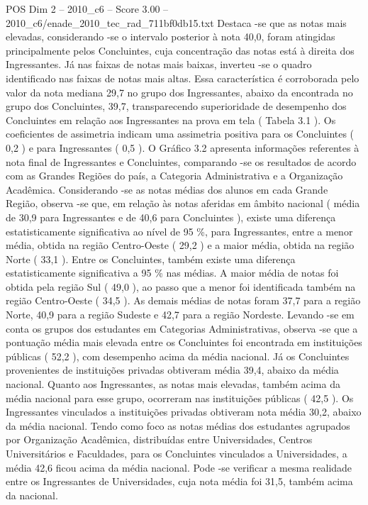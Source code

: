 \begin{textsample}{POS Dim 2 – 2010\_c6 – Score 3.00 – 2010\_c6/enade\_2010\_tec\_rad\_711bf0db15.txt}
Destaca -se que as notas mais elevadas, considerando -se o intervalo posterior à nota 40,0, foram atingidas principalmente pelos Concluintes, cuja concentração das notas está à direita dos Ingressantes.
Já nas faixas de notas mais baixas, inverteu -se o quadro identificado nas faixas de notas mais altas.
Essa característica é corroborada pelo valor da nota mediana 29,7 no grupo dos Ingressantes, abaixo da encontrada no grupo dos Concluintes, 39,7, transparecendo superioridade de desempenho dos Concluintes em relação aos Ingressantes na prova em tela ( Tabela 3.1 ).
Os coeficientes de assimetria indicam uma assimetria positiva para os Concluintes ( 0,2 ) e para Ingressantes ( 0,5 ).
O Gráfico 3.2 apresenta informações referentes à nota final de Ingressantes e Concluintes, comparando -se os resultados de acordo com as Grandes Regiões do país, a Categoria Administrativa e a Organização Acadêmica.
Considerando -se as notas médias dos alunos em cada Grande Região, observa -se que, em relação às notas aferidas em âmbito nacional ( média de 30,9 para Ingressantes e de 40,6 para Concluintes ), existe uma diferença estatisticamente significativa ao nível de 95 \%, para Ingressantes, entre a menor média, obtida na região Centro-Oeste ( 29,2 ) e a maior média, obtida na região Norte ( 33,1 ).
Entre os Concluintes, também existe uma diferença estatisticamente significativa a 95 \% nas médias.
A maior média de notas foi obtida pela região Sul ( 49,0 ), ao passo que a menor foi identificada também na região Centro-Oeste ( 34,5 ).
As demais médias de notas foram 37,7 para a região Norte, 40,9 para a região Sudeste e 42,7 para a região Nordeste.
Levando -se em conta os grupos dos estudantes em Categorias Administrativas, observa -se que a pontuação média mais elevada entre os Concluintes foi encontrada em instituições públicas ( 52,2 ), com desempenho acima da média nacional.
Já os Concluintes provenientes de instituições privadas obtiveram média 39,4, abaixo da média nacional.
Quanto aos Ingressantes, as notas mais elevadas, também acima da média nacional para esse grupo, ocorreram nas instituições públicas ( 42,5 ).
Os Ingressantes vinculados a instituições privadas obtiveram nota média 30,2, abaixo da média nacional.
Tendo como foco as notas médias dos estudantes agrupados por Organização Acadêmica, distribuídas entre Universidades, Centros Universitários e Faculdades, para os Concluintes vinculados a Universidades, a média 42,6 ficou acima da média nacional.
Pode -se verificar a mesma realidade entre os Ingressantes de Universidades, cuja nota média foi 31,5, também acima da nacional.

\end{textsample}
